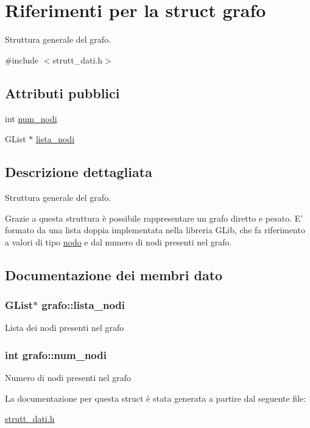 \hypertarget{structgrafo}{\section{Riferimenti per la struct grafo}
\label{structgrafo}
}


Struttura generale del grafo.  




{\ttfamily \#include $<$strutt\-\_\-dati.\-h$>$}

\subsection*{Attributi pubblici}
\begin{DoxyCompactItemize}
\item 
int \hyperlink{structgrafo_ab05142298c5857ab9e14b52f4b3820e1}{num\-\_\-nodi}
\item 
G\-List $\ast$ \hyperlink{structgrafo_a95906e11ba3224fa9fed6b8b2882e576}{lista\-\_\-nodi}
\end{DoxyCompactItemize}


\subsection{Descrizione dettagliata}
Struttura generale del grafo. 

Grazie a questa struttura è possibile rappresentare un grafo diretto e pesato. E' formato da una lista doppia implementata nella libreria G\-Lib, che fa riferimento a valori di tipo \hyperlink{structnodo}{nodo} e dal numero di nodi presenti nel grafo. 

\subsection{Documentazione dei membri dato}
\hypertarget{structgrafo_a95906e11ba3224fa9fed6b8b2882e576}{
\subsubsection[{lista\-\_\-nodi}]{\setlength{\rightskip}{0pt plus 5cm}G\-List$\ast$ grafo\-::lista\-\_\-nodi}}\label{structgrafo_a95906e11ba3224fa9fed6b8b2882e576}
Lista dei nodi presenti nel grafo \hypertarget{structgrafo_ab05142298c5857ab9e14b52f4b3820e1}{
\subsubsection[{num\-\_\-nodi}]{\setlength{\rightskip}{0pt plus 5cm}int grafo\-::num\-\_\-nodi}}\label{structgrafo_ab05142298c5857ab9e14b52f4b3820e1}
Numero di nodi presenti nel grafo 

La documentazione per questa struct è stata generata a partire dal seguente file\-:\begin{DoxyCompactItemize}
\item 
\hyperlink{strutt__dati_8h}{strutt\-\_\-dati.\-h}\end{DoxyCompactItemize}
